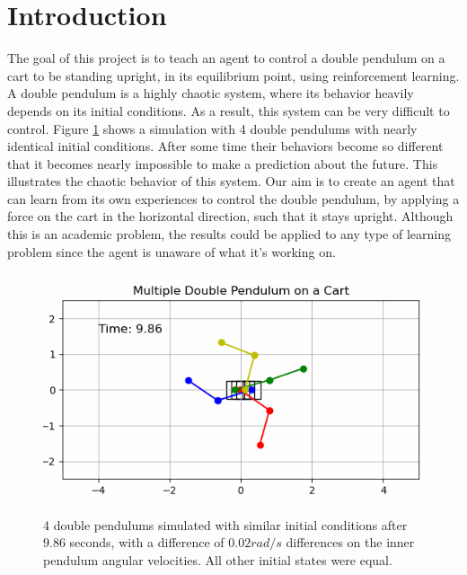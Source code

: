 \documentclass{LTHtwocol} %
\begin{document}
\section{Introduction}
The goal of this project is to teach an agent to control a double pendulum on a cart to be standing upright, in its equilibrium point, using reinforcement learning.
A double pendulum is a highly chaotic system, where its behavior heavily depends on its initial conditions.
As a result, this system can be very difficult to control.
Figure \ref{fig:double_pendulum_chaotic} shows a simulation with 4 double pendulums with nearly identical initial conditions.
After some time their behaviors become so different that it becomes nearly impossible to make a prediction about the future.
This illustrates the chaotic behavior of this system.
Our aim is to create an agent that can learn from its own experiences to control the double pendulum, by applying a force on the cart in the horizontal direction, such that it stays upright.
Although this is an academic problem, the results could be applied to any type of learning problem since the agent is unaware of what it's working on.
\cite{qlearning_first}
\begin{figure}[H]
	\centering
	\includegraphics[width=0.9\columnwidth]{figures/Double_Pendulum_Chaotic.PNG}
	\label{fig:double_pendulum_chaotic}
	\caption{4 double pendulums simulated with similar initial conditions after $9.86$ seconds, with a difference of $0.02 rad/s$ differences on the inner pendulum angular velocities. All other initial states were equal.}
\end{figure}
\end{document}
